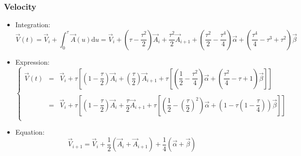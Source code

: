 \documentclass[aps,12pt]{revtex4}
\begin{document}
\subsubsection{Velocity}
\begin{itemize}
\item Integration:
\begin{equation}
	\vec{V}(t) = \vec{V}_i + \int_0^\tau \vec{A}(u)\mathrm{d}u = \vec{V}_i + \left(\tau-\dfrac{\tau^2}{2}\right) \vec{A}_i + \dfrac{\tau^2}{2} \vec{A}_{i+1} + \left(\dfrac{\tau^2}{2} - \dfrac{\tau^4}{4} \right) \vec{\alpha} + \left(\dfrac{\tau^4}{4} - \tau^3 + \tau^2\right) \vec{\beta}
\end{equation}

\item Expression:
\begin{equation}
\left\lbrace
\begin{array}{rcl}
 \vec{V}(t) & = &\vec{V}_i + \tau 
 \left[ \left(1-\dfrac{\tau}{2}\right) \vec{A}_i + \left(\dfrac{\tau}{2}\right) \vec{A}_{i+1} +
  \tau \left [
  \left(\dfrac{1}{2} - \dfrac{\tau^2}{4} \right) \vec{\alpha} + \left(\dfrac{\tau^2}{4} - \tau + 1\right) \vec{\beta}
  \right ]
 \right]\\
 \\
  & = & \vec{V}_i + \tau 
 \left[ \left(1-\dfrac{\tau}{2}\right) \vec{A}_i + \dfrac{\tau}{2} \vec{A}_{i+1} +
  \tau \left [
  \left(\dfrac{1}{2} -  \left(\dfrac{\tau}{2}\right)^2 \right) \vec{\alpha} + \left( 1-\tau \left(1-\dfrac{\tau}{4}\right)\right) \vec{\beta}
  \right ]
 \right]\\
 \end{array}
 \right.
\end{equation}

\item Equation:
\begin{equation}
\vec{V}_{i+1} = \vec{V}_i + \dfrac{1}{2}\left(\vec{A}_i + \vec{A}_{i+1}\right) + \dfrac{1}{4} \left( \vec{\alpha} + \vec{\beta}\right)
\end{equation}

\end{itemize}
\end{document}
